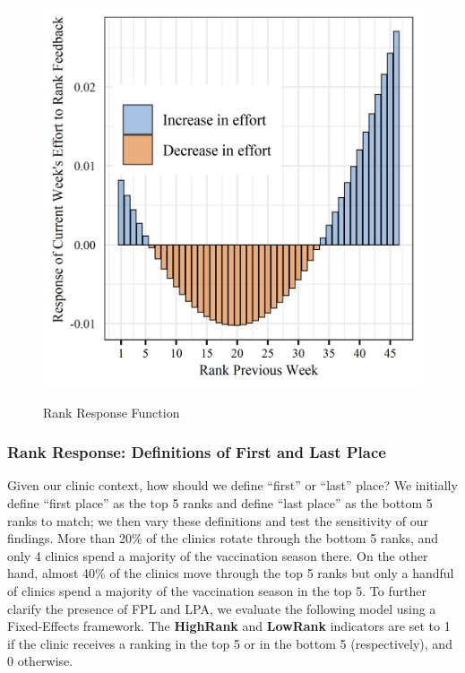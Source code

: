 \begin{onehalfspace}
 \begin{figure}[p]
     \centering
     \caption{Rank Response Function} %
     \includegraphics[scale=1]{Figures/CC/Rank Response - Ranking Group (color).png}     
     \label{fig:rank_resp}
 \end{figure} 
 
 \subsubsection{Rank Response: Definitions of First and Last Place}
 Given our clinic context, how should we define “first” or “last” place? We initially define “first place” as the top 5 ranks and define “last place” as the bottom 5 ranks to match; we then vary these definitions and test the sensitivity of our findings. More than 20\% of the clinics rotate through the bottom 5 ranks, and only 4 clinics spend a majority of the vaccination season there. On the other hand, almost 40\% of the clinics move through the top 5 ranks but only a handful of clinics spend a majority of the vaccination season in the top 5. To further clarify the presence of FPL and LPA, we evaluate the following model using a Fixed-Effects framework. The \textbf{HighRank} and \textbf{LowRank} indicators are set to 1 if the clinic receives a ranking in the top 5 or in the bottom 5 (respectively), and 0 otherwise.


\end{onehalfspace}
